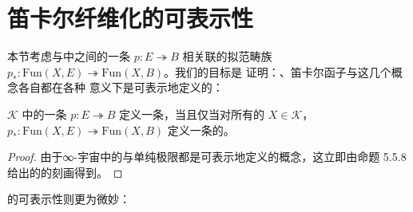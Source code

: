 \providecommand{\qcor}[1]{\ulcorner#1\urcorner}   %
\providecommand{\cellpair}[5]{$\vcenter{\hbox{\begin{tikzpicture}[x=1.15em,y=1.15em]%
\node (s) at (0,0) {$#1$};%
\node (t) at (4.2,0) {$#2$};%
\draw[->] (0.75,0.32) to[bend left=18] (3.45,0.32);%
\node at (2.1,0.88) {$\scriptstyle#3$};%
\draw[->] (0.75,-0.32) to[bend right=18] (3.45,-0.32);%
\node at (2.1,-0.93) {$\scriptstyle#4$};%
\draw[->] (1.95,0.2) to[bend right=32] (1.95,-0.2);%
\node at (2.85,0) {$\scriptstyle#5$};%
\end{tikzpicture}}}$\ignorespaces}
\providecommand{\bijarrow}{\twoheadleftarrow\!\!\twoheadrightarrow}

\section{笛卡尔纤维化的可表示性}\label{sec:representability-of-cartesian-fibrations}

本节考虑与\trInfinityCosmos{}中\trInfinityCategory{}之间的一条\trIsofibration{}%
$p\colon E\twoheadrightarrow B$ 相关联的拟范畴\trIsofibration{}族
$p_{*}\colon\mathrm{Fun}(X,E)\twoheadrightarrow\mathrm{Fun}(X,B)$。我们的目标是%
证明：\trCartesianFibration、笛卡尔函子与\trDiscreteCartesianFibration{}这几个概念各自都在各种%
意义下是可表示地定义的：

\begin{proposition}\label{prop:discrete-cartesian-representable}
\trInfinityCosmos{} $\mathcal{K}$ 中的一条\trIsofibration{}
$p\colon E\twoheadrightarrow B$ 定义一条\trDiscreteCartesianFibration，当且仅当对所有的
$X\in\mathcal{K}$，$p_{*}\colon\mathrm{Fun}(X,E)\twoheadrightarrow\mathrm{Fun}(X,B)$
定义一条\trQuasiCategory{}的\trDiscreteCartesianFibration。
\end{proposition}

\begin{proof}
由于∞-宇宙中的\trEquivalence{}与单纯极限都是可表示地定义的概念，这立即由命题
5.5.8 给出的\trDiscreteCartesianFibration{}的刻画得到。
\end{proof}

\trCartesianFibration{}的可表示性则更为微妙：

